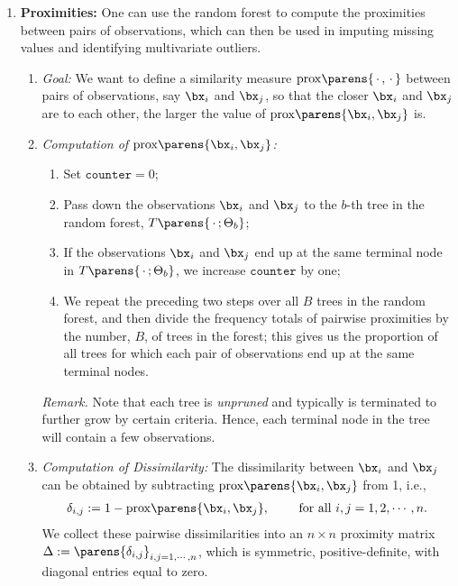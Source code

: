 \documentclass[12pt]{article}
\begin{document}
\begin{enumerate}[label=\textbf{\arabic*.}]
	\item \textbf{Proximities:} One can use the random forest to compute the proximities between pairs of observations, which can then be used in imputing missing values and identifying multivariate outliers. 
	\begin{enumerate}
		\item \textit{Goal:} We want to define a similarity measure $\mathrm{prox} \parens{\,\cdot\,, \,\cdot\,}$ between pairs of observations, say $\bx_i$ and $\bx_j$, so that the closer $\bx_i$ and $\bx_j$ are to each other, the larger the value of $\mathrm{prox} \parens{\bx_i, \bx_j}$ is. 
		\item \textit{Computation of $\mathrm{prox} \parens{\bx_i, \bx_j}$:} 
		\begin{enumerate}
			\item Set $\mathtt{counter} = 0$; 
			\item Pass down the observations $\bx_i$ and $\bx_j$ to the $b$-th tree in the random forest, $T \parens{\,\cdot\,; \Theta_b}$; 
			\item If the observations $\bx_i$ and $\bx_j$ end up at the same terminal node in $T \parens{\,\cdot\,; \Theta_b}$, we increase $\mathtt{counter}$ by one; 
			\item We repeat the preceding two steps over all $B$ trees in the random forest, and then divide the frequency totals of pairwise proximities by the number, $B$, of trees in the forest; this gives us the proportion of all trees for which each pair of observations end up at the same terminal nodes. 
		\end{enumerate}
		
		\textit{Remark.} Note that each tree is \emph{unpruned} and typically is terminated to further grow by certain criteria. Hence, each terminal node in the tree will contain a few observations. 
		
		\item \textit{Computation of Dissimilarity:} The dissimilarity between $\bx_i$ and $\bx_j$ can be obtained by subtracting $\mathrm{prox} \parens{\bx_i, \bx_j}$ from 1, i.e., 
		\begin{align*}
			\delta_{i,j} := 1 - \mathrm{prox} \parens{\bx_i, \bx_j}, \qquad \text{ for all } i, j = 1, 2, \cdots, n. 
		\end{align*}
		We collect these pairwise dissimilarities into an $n \times n$ proximity matrix $\Delta := \parens{\delta_{i, j}}_{i,j=1,\cdots,n}$, which is symmetric, positive-definite, with diagonal entries equal to zero. 


\end{enumerate}
\end{enumerate}
\end{document}
